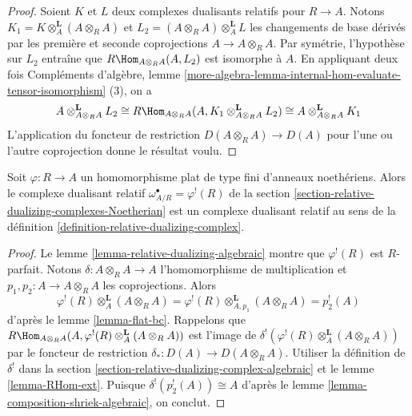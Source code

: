 \begin{proof}
Soient $K$ et $L$ deux complexes dualisants relatifs pour $R \to A$.
Notons $K_1 = K \otimes_A^\mathbf{L} (A \otimes_R A)$ et $L_2 = (A \otimes_R A) \otimes_A^\mathbf{L} L$ les changements de base dérivés
par les première et seconde coprojections $A \to A \otimes_R A$.
Par symétrie, l'hypothèse sur $L_2$ entraîne que $R\Hom_{A \otimes_R A}(A, L_2)$ est isomorphe à $A$.
En appliquant deux fois Compléments d'algèbre, lemme \ref{more-algebra-lemma-internal-hom-evaluate-tensor-isomorphism} (3), on a
$$
A \otimes_{A \otimes_R A}^\mathbf{L} L_2 \cong
R\Hom_{A \otimes_R A}(A, K_1 \otimes_{A \otimes_R A}^\mathbf{L} L_2) \cong
A \otimes_{A \otimes_R A}^\mathbf{L} K_1
$$
L'application du foncteur de restriction $D(A \otimes_R A) \to D(A)$
pour l'une ou l'autre coprojection donne le résultat voulu.
\end{proof}

\begin{lemma}
\label{lemma-relative-dualizing-noetherian}
Soit $\varphi : R \to A$ un homomorphisme plat de type fini d'anneaux noethériens.
Alors le complexe dualisant relatif $\omega_{A/R}^\bullet = \varphi^!(R)$ de la section \ref{section-relative-dualizing-complexes-Noetherian}
est un complexe dualisant relatif au sens de la définition \ref{definition-relative-dualizing-complex}.
\end{lemma}

\begin{proof}
Le lemme \ref{lemma-relative-dualizing-algebraic} montre que $\varphi^!(R)$ est $R$-parfait.
Notons $\delta : A \otimes_R A \to A$ l'homomorphisme de multiplication et $p_1, p_2 : A \to A \otimes_R A$ les coprojections.
Alors
$$
\varphi^!(R) \otimes_A^\mathbf{L} (A \otimes_R A) =
\varphi^!(R) \otimes_{A, p_1}^\mathbf{L} (A \otimes_R A) =
p_2^!(A)
$$
d'après le lemme \ref{lemma-flat-bc}. Rappelons que
$
R\Hom_{A \otimes_R A}(A, \varphi^!(R) \otimes_A^\mathbf{L} (A \otimes_R A))
$
est l'image de $\delta^!(\varphi^!(R) \otimes_A^\mathbf{L} (A \otimes_R A))$ par le foncteur de restriction $\delta_* : D(A) \to D(A \otimes_R A)$.
Utiliser la définition de $\delta^!$ dans la section \ref{section-relative-dualizing-complex-algebraic}
et le lemme \ref{lemma-RHom-ext}.
Puisque $\delta^!(p_2^!(A)) \cong A$ d'après le lemme \ref{lemma-composition-shriek-algebraic}, on conclut.
\end{proof}

